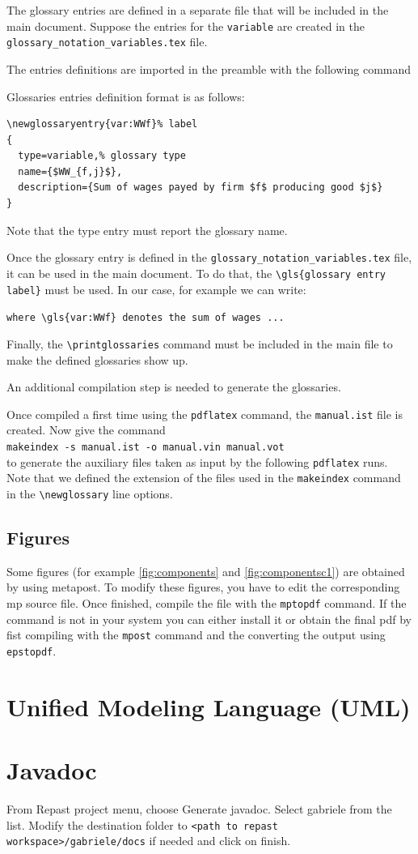 \documentclass{book}
\begin{document}
The glossary entries are defined in a separate file that will be included in the main document. Suppose the entries for the \verb+variable+ are created in the \verb+glossary_notation_variables.tex+ file. 

The entries definitions are imported in the preamble with the following command\\
\verb++

Glossaries entries definition format is as follows:

\begin{verbatim}
\newglossaryentry{var:WWf}% label 
{ 
  type=variable,% glossary type 
  name={$WW_{f,j}$}, 
  description={Sum of wages payed by firm $f$ producing good $j$} 
}
\end{verbatim}

Note that the type entry must report the glossary name.

Once the glossary entry is defined in the \verb+glossary_notation_variables.tex+ file, it can be used in the main document. To do that, the 
\verb+\gls{glossary entry label}+ must be used. In our case, for example we can write:

\verb+where \gls{var:WWf} denotes the sum of wages ...+

Finally, the \verb+\printglossaries+ command must be included in the main file to make the defined glossaries show up. 

An additional compilation step is needed to generate the glossaries.

Once compiled a first time using the \verb+pdflatex+ command, the \verb+manual.ist+ file is created. Now give the command\\
\verb+makeindex -s manual.ist -o manual.vin manual.vot+\\
to generate the auxiliary files taken as input by the following \verb+pdflatex+ runs. Note that we defined the extension of the files used in the \verb+makeindex+ command in the \verb+\newglossary+ line options.


\section{Figures}

Some figures (for example \ref{fig:components} and \ref{fig:componentsc1}) are obtained by using metapost.
To modify these figures, you have to edit the corresponding mp source file. Once finished, compile the file with the \verb+mptopdf+ command. If the command is not in your system you can either install it or obtain the final pdf by fist compiling with the \verb+mpost+ command and the converting the output using \verb+epstopdf+.



\chapter{Unified Modeling Language (UML)}


\chapter{Javadoc}

From Repast project menu, choose Generate javadoc. Select gabriele from the list. Modify the destination folder to 
\verb+<path to repast workspace>/gabriele/docs+ if needed and click on finish.
\end{document}
